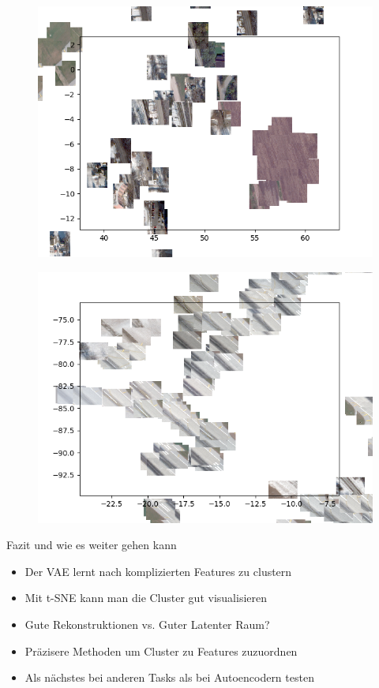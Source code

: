 \begin{frame}
	\begin{figure}
		\includegraphics[width=\textwidth]
		{images/figures/experiments_latent/convolutional_dim50_images_upwards_observation.png}
	\end{figure}
\end{frame}

\begin{frame}
	\begin{figure}
		\includegraphics[width=\textwidth]
		{images/figures/experiments_latent/convolutional_dim50_images_sideways_street3.png}
	\end{figure}
\end{frame}

\begin{frame}{Fazit und wie es weiter gehen kann}
	\begin{itemize}
		\item Der VAE lernt nach komplizierten Features zu clustern
		\item Mit t-SNE kann man die Cluster gut visualisieren
		\item Gute Rekonstruktionen vs. Guter Latenter Raum?
		\item Präzisere Methoden um Cluster zu Features zuzuordnen
		\item Als nächstes bei anderen Tasks als bei Autoencodern testen
	\end{itemize}
\end{frame}